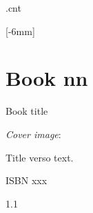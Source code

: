 \documentclass{ouunit}
\begin{document}
\newwrite\cntwrite\immediate\openout\cntwrite\jobname.cnt\relax
\makeatletter
\renewcommand{\makefrontpages}{\ifx\@unittitle\@empty\relax\else
\strut\vfill
\pagestyle{empty}
\section*{\sf Unit \@unitid}
{\Huge\sf \@unittitle}
\addtocontents{toc}{\protect\vspace{3ex}}
\edef\rh@temp{\noexpand\addcontentsline{toc}{section}{\@title}}\rh@temp\let\rh@temp\relax
\vfill\vfill
\cleardoublepage
\fi
\immediate\write\cntwrite{\string\ifdefstring{\string\@unitid}{\@unitid}{\string\setcounter{page}{\the\value{page}}}{}}%
\pagestyle{plain}
\setcounter{section}{0}
\setcounter{equation}{0}
\setcounter{exercise}{0}
\setcounter{example}{0}
\setcounter{figure}{0}
\setcounter{table}{0}
\immediate\openout\exercises@write\jobname.ex
\immediate\openout\activities@write\jobname.act
}
\let\realprintindex\printindex
\def\printindex{}
\pagestyle{empty}
\strut\marginnote{\oulogo}[-6mm]\par

\vfill
\section*{\sf \@modulecode}

{\huge\sf \@moduletitle}

\vspace{2ex}

\section*{\sf Book nn}

{\Huge\sf Book title}
\vfill\vfill\vfill
\makeatother
\newpage
{} %
{\small
    \emph{Cover image}: \par
Title verso text.\par
\vfill\vfill
\vfill
    ISBN xxx\par
    1.1
}%
\restoregeometry
\newpage
\tableofcontents
\cleardoublepage
\pagestyle{plain}
\setcounter{page}{1}

\cleardoublepage

\cleardoublepage
\realprintindex
\end{document}
